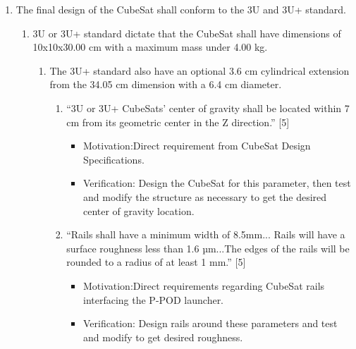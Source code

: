 \begin{enumerate} %
    \item The final design of the CubeSat shall conform to the 3U and 3U+ standard.
    \begin{enumerate}
        \item 3U or 3U+ standard dictate that the CubeSat shall have dimensions of 10x10x30.00 cm with a maximum mass under 4.00 kg.
        \begin{enumerate}
            \item The 3U+ standard also have an optional 3.6 cm cylindrical extension from the 34.05 cm dimension with a 6.4 cm diameter.  
            \begin{enumerate}
                \item “3U or 3U+ CubeSats’ center of gravity shall be located within 7 cm from its geometric center in the Z direction.” [5] \cite{} 
                \begin{itemize}
                    \item Motivation:Direct requirement from CubeSat Design Specifications. 
                    \item Verification: Design the CubeSat for this parameter, then test and modify the structure as necessary to get the desired center of gravity location. 
                \end{itemize}
                \item “Rails shall have a minimum width of 8.5mm... Rails will have a surface roughness less than 1.6 µm...The edges of the rails will be rounded to a radius of at least 1 mm.” [5] \cite{}
                \begin{itemize}
                    \item Motivation:Direct requirements regarding CubeSat rails interfacing the P-POD launcher.  
                    \item Verification: Design rails around these parameters and test and modify to get desired roughness. 
                \end{itemize}
            \end{enumerate}
        \end{enumerate}


\end{enumerate}
\end{enumerate}
